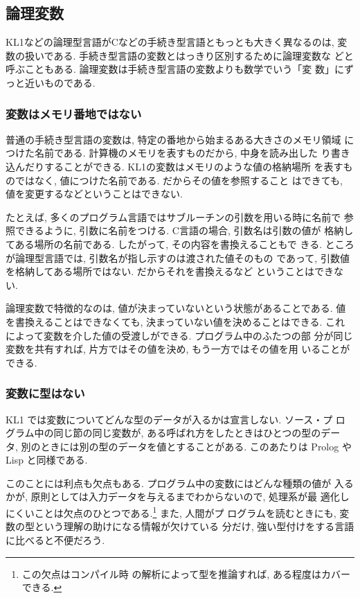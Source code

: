 \documentclass[a4,titlepage]{jsreport}
\begin{document}
\subsection{論理変数}
KL1などの論理型言語がCなどの手続き型言語ともっとも大きく異なるのは, 変
数の扱いである.  手続き型言語の変数とはっきり区別するために論理変数な
どと呼ぶこともある.  論理変数は手続き型言語の変数よりも数学でいう「変
数」にずっと近いものである.

\subsubsection{変数はメモリ番地ではない}
普通の手続き型言語の変数は, 特定の番地から始まるある大きさのメモリ領域
につけた名前である.  計算機のメモリを表すものだから, 中身を読み出した
り書き込んだりすることができる.  KL1の変数はメモリのような値の格納場所
を表すものではなく, 値につけた名前である.  だからその値を参照すること
はできても, 値を変更するなどということはできない.

たとえば, 多くのプログラム言語ではサブルーチンの引数を用いる時に名前で
参照できるように, 引数に名前をつける.  C言語の場合, 引数名は引数の値が
格納してある場所の名前である.  したがって, その内容を書換えることもで
きる.  ところが論理型言語では, 引数名が指し示すのは渡された値そのもの
であって, 引数値を格納してある場所ではない.  だからそれを書換えるなど
ということはできない.

論理変数で特徴的なのは, 値が決まっていないという状態があることである.
値を書換えることはできなくても, 決まっていない値を決めることはできる.
これによって変数を介した値の受渡しができる.  プログラム中のふたつの部
分が同じ変数を共有すれば, 片方ではその値を決め, もう一方ではその値を用
いることができる.

\subsubsection{変数に型はない}
KL1 では変数についてどんな型のデータが入るかは宣言しない.  ソース・プ
ログラム中の同じ節の同じ変数が, ある呼ばれ方をしたときはひとつの型のデー
タ, 別のときには別の型のデータを値とすることがある.  このあたりは 
Prolog や Lisp と同様である.

このことには利点も欠点もある.  プログラム中の変数にはどんな種類の値が
入るかが, 原則としては入力データを与えるまでわからないので, 処理系が最
適化しにくいことは欠点のひとつである.\footnote{この欠点はコンパイル時
の解析によって型を推論すれば, ある程度はカバーできる.} また, 人間がプ
ログラムを読むときにも, 変数の型という理解の助けになる情報が欠けている
分だけ, 強い型付けをする言語に比べると不便だろう.
\end{document}
